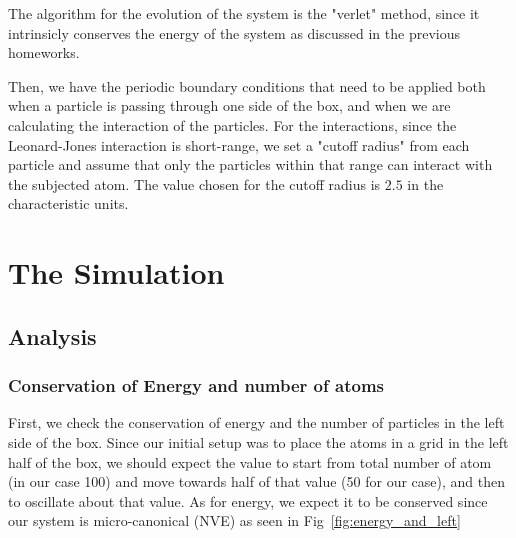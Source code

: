 \documentclass[12pt, a4paper]{article}
\begin{document}
	The algorithm for the evolution of the system is the "verlet" method, since it intrinsicly conserves the energy of the system as discussed in the previous homeworks. 
	
	Then, we have the periodic boundary conditions that need to be applied both when a 
	particle is passing through one side of the box, and when we are calculating the interaction 
	of the particles. For the interactions, since the Leonard-Jones interaction is short-range, we
	set a "cutoff radius" from each particle and assume that only the particles within that range 
	can interact with the subjected atom. The value chosen for the cutoff radius is $2.5$ in the 
	characteristic units.
	
	\section{The Simulation}
	\subsection{Analysis}
	\subsubsection{Conservation of Energy and number of atoms}
	First, we check the conservation of energy and the number of particles in the left side of the 
	box. Since our initial setup was to place the atoms in a grid in the left half of the box, we 
	should expect the value to start from total number of atom (in our case 100) and move towards half of that value (50 for our case), and then to oscillate about that value. As for
	energy, we expect it to be conserved since our system is micro-canonical (NVE) as seen in
	Fig~\ref{fig:energy_and_left}
	
\end{document}
